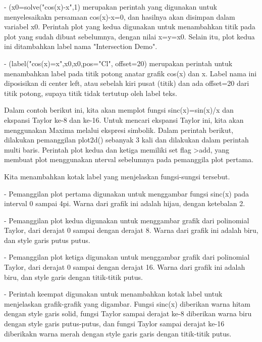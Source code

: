 \documentclass{article}
\begin{document}
\begin{eulernotebook}
\begin{eulercomment}
\begin{eulercomment}
\begin{eulercomment}
\begin{eulercomment}
\begin{eulercomment}
- (x0=solve("cos(x)-x",1) merupakan perintah yang digunakan untuk
menyelesaikakn persamaan cos(x)-x=0, dan hasilnya akan disimpan dalam
variabel x0. Perintah plot yang kedua digunakan untuk menambahkan
titik pada plot yang sudah dibuat sebelumnya, dengan nilai x=y=x0.
Selain itu, plot kedua ini ditambahkan label nama "Intersection Demo".

- (label("cos(x)=x",x0,x0,pos="Cl", offset=20) merupakan perintah
untuk menambahkan label pada titik potong anatar grafik cos(x) dan x.
Label nama ini diposisikan di center left, atau sebelah kiri pusat
(titik) dan ada offset=20 dari titik potong, supaya titik tidak
tertutup oleh label teks.

Dalam contoh berikut ini, kita akan memplot fungsi sinc(x)=sin(x)/x
dan ekspansi Taylor ke-8 dan ke-16. Untuk mencari ekspansi Taylor ini,
kita akan menggunakan Maxima melalui ekspresi simbolik. Dalam perintah
berikut, dilakukan pemanggilan plot2d() sebanyak 3 kali dan dilakukan
dalam perintah multi baris. Perintah plot kedua dan ketiga memiliki
set flag \textgreater{}add, yang membuat plot menggunakan nterval sebelumnya pada
pemanggila plot pertama.

Kita menambahkan kotak label yang menjelaskan fungsi-sungsi tersebut.
\end{eulercomment}
\begin{eulercomment}
- Pemanggilan plot pertama digunakan untuk menggambar fungsi sinc(x)
pada interval 0 sampai 4pi. Warna dari grafik ini adalah hijau, dengan
ketebalan 2.

- Pemanggilan plot kedua digunakan untuk menggambar grafik dari
polinomial Taylor, dari derajat 0 sampai dengan derajat 8. Warna dari
grafik ini adalah biru, dan style garis putus putus.

- Pemanggilan plot ketiga digunakan untuk menggambar grafik dari
polinomial Taylor, dari derajat 0 sampai dengan derajat 16. Warna dari
grafik ini adalah biru, dan style garis dengan titik-titik putus.

- Perintah keempat digunakan untuk menambahkan kotak label untuk
menjelaskan grafik-grafik yang digambar. Fungsi sinc(x) diberikan
warna hitam dengan style garis solid, fungsi Taylor sampai derajat
ke-8 diberikan warna biru dengan style garis putus-putus, dan fungsi
Taylor sampai derajat ke-16 diberikakn warna merah dengan style garis
garis dengan titik-titik putus.


\end{eulercomment}
\end{eulercomment}
\end{eulercomment}
\end{eulercomment}
\end{eulercomment}
\end{eulernotebook}
\end{document}
